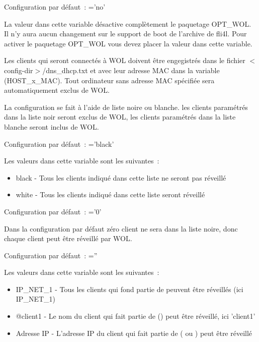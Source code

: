 \begin{description}


  Configuration par défaut~:  ='no'

  La valeur  dans cette variable désactive complètement le paquetage
  OPT\_WOL. Il n'y aura aucun changement sur le support de boot de l'archive
   de fli4l. Pour activer le paquetage OPT\_WOL vous devez placer
  la valeur  dans cette variable.

  Les clients qui seront connectés à WOL doivent être engegistrés dans le
  fichier $<$config-dir$>$/dns\_dhcp.txt et avec leur adresse MAC dans la
  variable (HOST\_x\_MAC). Tout ordinateur sans adresse MAC spécifiée sera
  automatiquement exclus de WOL.


    La configuration se fait à l'aide de liste noire ou blanche. les clients
    paramétrés dans la liste noir seront exclus de WOL, les clients paramétrés
    dans la liste blanche seront inclus de WOL.

  Configuration par défaut~:  ='black'

  Les valeurs dans cette variable sont les suivantes~:
  \begin{itemize}
    \item black - Tous les clients indiqué dans cette liste ne seront pas réveillé
    \item white - Tous les clients indiqué dans cette liste seront réveillé
  \end{itemize}


  Configuration par défaut~:  ='0'

  Dans la configuration par défaut zéro client ne sera dans la liste noire,
  donc chaque client peut être réveillé par WOL.


  Configuration par défaut~:  =''

  Les valeurs dans cette variable sont les suivantes~:
  \begin{itemize}
    \item IP\_NET\_1 - Tous les clients qui fond partie de 
      peuvent être réveillés (ici IP\_NET\_1)
    \item @client1 - Le nom du client qui fait partie de ()
      peut être réveillé, ici 'client1'
    \item Adresse IP - L'adresse IP du client qui fait partie de (
      ou ) peut être réveillé
  \end{itemize}


\end{description}
